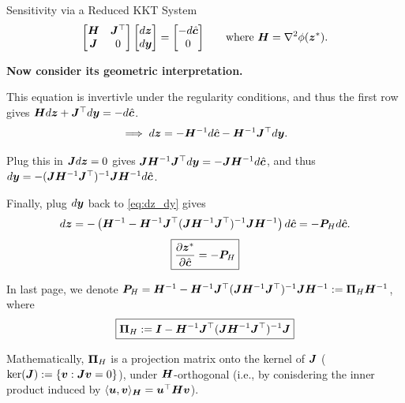 \documentclass[10pt,aspectratio=169,xcolor=dvipsnames]{beamer}
\begin{document}
\begin{frame}[allowframebreaks]{Sensitivity via a Reduced KKT System}
\begin{equation}
{            \begin{bmatrix}
                {\bm{H}}& {\bm{J}}^\top\\
                {\bm{J}}& 0
            \end{bmatrix}
            \begin{bmatrix}
                d{\bm{z}}\\
                d{\bm{y}}\end{bmatrix}
            =
            \begin{bmatrix}
                -d\hat{{\bm{c}}}\\
                0
            \end{bmatrix}
        } \qquad \text{where } {\bm{H}} = \nabla^2 \phi({\bm{z}}^*).
    \end{equation}

    \textbf{Now consider its geometric interpretation.}

    This equation is invertivle under the regularity conditions, and thus the first row gives ${\bm{H}} d{\bm{z}} + {\bm{J}}^\top d{\bm{y}} = -d\hat{{\bm{c}}}$.
    \begin{equation}\label{eq:dz_dy}
        \implies d{\bm{z}} = -{\bm{H}}^{-1} d\hat{{\bm{c}}} - {\bm{H}}^{-1} {\bm{J}}^\top d{\bm{y}}.
    \end{equation}


    Plug this in ${\bm{J}} d{\bm{z}} = 0$ gives ${\bm{J}} {\bm{H}}^{-1} {\bm{J}}^\top d{\bm{y}} = -{\bm{J}} {\bm{H}}^{-1} d\hat{{\bm{c}}}$, and thus $d{\bm{y}} = -({\bm{J}} {\bm{H}}^{-1} {\bm{J}}^\top)^{-1} {\bm{J}} {\bm{H}}^{-1} d\hat{{\bm{c}}}$.

    Finally, plug $d{\bm{y}}$ back to \eqref{eq:dz_dy} gives
    \begin{equation}\label{eq:dz_dhatc_final}
        d{\bm{z}} = -\left( {\bm{H}}^{-1} - {\bm{H}}^{-1} {\bm{J}}^\top ({\bm{J}} {\bm{H}}^{-1} {\bm{J}}^\top)^{-1} {\bm{J}} {\bm{H}}^{-1} \right) d\hat{{\bm{c}}} = -{\bm{P}}_H d\hat{{\bm{c}}}.
    \end{equation}
    \begin{equation}\label{eq:dz_dhatc}
        \boxed{\frac{\partial {\bm{z}}^*}{\partial \hat{{\bm{c}}}} = -{\bm{P}}_H}
    \end{equation}

    \break

    In last page, we denote ${\bm{P}}_H = {\bm{H}}^{-1} - {\bm{H}}^{-1} {\bm{J}}^\top ({\bm{J}} {\bm{H}}^{-1} {\bm{J}}^\top)^{-1} {\bm{J}} {\bm{H}}^{-1} := {\bm{\Pi}}_H {\bm{H}}^{-1}$, where
    \begin{equation}
        \boxed{{\bm{\Pi}}_H := {\bm{I}} - {\bm{H}}^{-1} {\bm{J}}^\top ({\bm{J}} {\bm{H}}^{-1} {\bm{J}}^\top)^{-1} {\bm{J}}}
    \end{equation}

    Mathematically, ${\bm{\Pi}}_H$ is a projection matrix onto the kernel of ${\bm{J}}$ ($\ker({\bm{J}}) := \{{\bm{v}} : {\bm{J}} {\bm{v}} = 0\}$), under ${\bm{H}}$-orthogonal (i.e., by conisdering the inner product induced by $\langle {\bm{u}},{\bm{v}}\rangle_{{\bm{H}}} = {\bm{u}}^\top {\bm{H}} {\bm{v}}$).


\end{frame}
\end{document}
